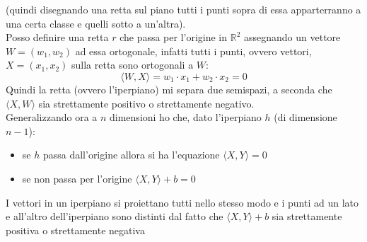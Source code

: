 \begin{esercizio}
\begin{shaded}
									      			      				(quindi disegnando una retta sul piano tutti i punti sopra di essa
									      			      				apparterranno a una certa classe e quelli sotto a un'altra).\\
									      			      				Posso definire una retta $r$ che passa per l'origine in  $\mathbb{R}^2$
									      			      				assegnando un vettore $W=(w_1, w_2)$ ad essa ortogonale, infatti tutti i punti,
									      			      				ovvero vettori, $X=(x_1, x_2)$ sulla retta sono ortogonali a $W$:
									      			      				\[\langle W, X\rangle=w_1\cdot x_1+w_2\cdot x_2=0 \]
									      			      				Quindi la retta (ovvero l'iperpiano) mi separa due semispazi, a seconda che
									      			      				$\langle X, W\rangle$ sia strettamente positivo o strettamente negativo.\\
									      			      				Generalizzando ora a $n$ dimensioni ho che, dato l'iperpiano $h$ (di
									      			      				dimensione $n-1$):
									      			      				\begin{itemize}
									      			      					\item se $h$ passa dall'origine allora si ha l'equazione $\langle X, Y\rangle
									      			      					      =0$
									      			      					\item se non passa per l'origine $\langle X, Y\rangle +b=0$ 
									      			      					          
									      			      				\end{itemize}
									      			      				I vettori in un iperpiano si proiettano tutti nello stesso modo e i punti ad
									      			      				un lato e all'altro dell'iperpiano sono distinti dal fatto che $\langle
									      			      				X, Y\rangle +b$ sia strettamente positiva o strettamente negativa
									      			      				\end{shaded}
									      			      				\end{esercizio}